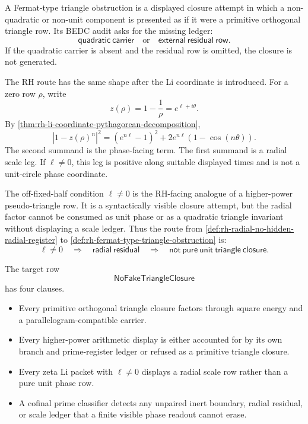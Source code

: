 \begin{definition}
\label{def:rh-fermat-type-triangle-obstruction}
A Fermat-type triangle obstruction is a displayed closure attempt in
which a non-quadratic or non-unit component is presented as if it were a
primitive orthogonal triangle row.  Its BEDC audit asks for the missing
ledger:
$$
\mathsf{quadratic\ carrier}
\quad\text{or}\quad
\mathsf{external\ residual\ row}.
$$
If the quadratic carrier is absent and the residual row is omitted, the
closure is not generated.
\end{definition}

The RH route has the same shape after the Li coordinate is introduced.
For a zero row $\rho$, write
$$
z(\rho)=1-\frac1\rho=e^{\ell+i\theta}.
$$
By \autoref{thm:rh-li-coordinate-pythagorean-decomposition},
$$
|1-z(\rho)^n|^2
=
(e^{n\ell}-1)^2
+
2e^{n\ell}(1-\cos(n\theta)).
$$
The second summand is the phase-facing term.  The first summand is a
radial scale leg.  If $\ell\ne0$, this leg is positive along suitable
displayed times and is not a unit-circle phase coordinate.

\begin{principle}
\label{prin:rh-radial-scale-not-phase-closure}
The off-fixed-half condition $\ell\ne0$ is the RH-facing analogue of a
higher-power pseudo-triangle row.  It is a syntactically visible closure
attempt, but the radial factor cannot be consumed as unit phase or as a
quadratic triangle invariant without displaying a scale ledger.  Thus the
route from \autoref{def:rh-radial-no-hidden-radial-register} to
\autoref{def:rh-fermat-type-triangle-obstruction} is:
$$
\ell\ne0
\quad\Longrightarrow\quad
\mathsf{radial\ residual}
\quad\Longrightarrow\quad
\mathsf{not\ pure\ unit\ triangle\ closure}.
$$
\end{principle}

\begin{definition}
\label{def:rh-no-fake-triangle-closure-target}
The target row
$$
\mathsf{NoFakeTriangleClosure}
$$
has four clauses.
\begin{itemize}
  \item Every primitive orthogonal triangle closure factors through
  square energy and a parallelogram-compatible carrier.
  \item Every higher-power arithmetic display is either accounted for by
  its own branch and prime-register ledger or refused as a primitive
  triangle closure.
  \item Every zeta Li packet with $\ell\ne0$ displays a radial scale row
  rather than a pure unit phase row.
  \item A cofinal prime classifier detects any unpaired inert boundary,
  radial residual, or scale ledger that a finite visible phase readout
  cannot erase.
\end{itemize}
\end{definition}

